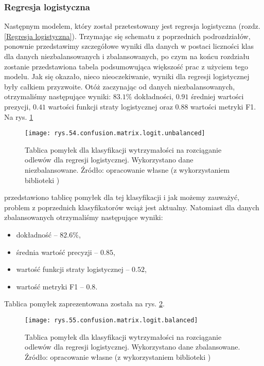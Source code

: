 \subsubsection{Regresja logistyczna}
\label{structures.with.logit}

Następnym modelem, który został przetestowany jest regresja logistyczna (rozdz. \ref{Regresja logistyczna}). Trzymając się schematu z poprzednich podrozdziałów, ponownie przedstawimy szczegółowe wyniki dla danych w postaci liczności klas dla danych niezbalansowanych i zbalansowanych, po czym na końcu rozdziału zostanie przedstawiona tabela podsumowująca większość prac z użyciem tego modelu. 
Jak się okazało, nieco nieoczekiwanie, wyniki dla regresji logistycznej były całkiem przyzwoite. Otóż zaczynając od danych niezbalansowanych, otrzymaliśmy następujące wyniki: $83.1\%$ dokładności, $0.91$ średniej wartości prezycji, $0.41$ wartości funkcji straty logistycznej oraz $0.88$ wartości metryki F1. Na rys. \ref{rys.54.confusion.matrix.logit.unbalanced} 
\begin{figure}[!h]
    \centering
    \texttt{[image: rys.54.confusion.matrix.logit.unbalanced]}
    \caption{Tablica pomyłek dla klasyfikacji wytrzymałości na rozciąganie odlewów dla regresji logistycznej. Wykorzystano dane niezbalansowane. Źródło: opracowanie własne (z wykorzystaniem biblioteki )}
    \label{rys.54.confusion.matrix.logit.unbalanced}
\end{figure}
przedstawiono tablicę pomyłek dla tej klasyfikacji i jak możemy zauważyć, problem z poprzednich klasyfikatorów wciąż jest aktualny.
Natomiast dla danych zbalansowanych otrzymaliśmy następujące wyniki:
\begin{itemize}
	\item dokładność – $82.6\%$,
	\item średnia wartość precyzji – $0.85$,
	\item wartość funkcji straty logistycznej – $0.52$,
	\item wartość metryki F1 – $0.8$.
\end{itemize}
Tablica pomyłek zaprezentowana została na rys. \ref{rys.55.confusion.matrix.logit.balanced}. 
\begin{figure}[!h]
    \centering
    \texttt{[image: rys.55.confusion.matrix.logit.balanced]}
    \caption{Tablica pomyłek dla klasyfikacji wytrzymałości na rozciąganie odlewów dla regresji logistycznej. Wykorzystano dane zbalansowane. Źródło: opracowanie własne (z wykorzystaniem biblioteki )}
    \label{rys.55.confusion.matrix.logit.balanced}
\end{figure}

